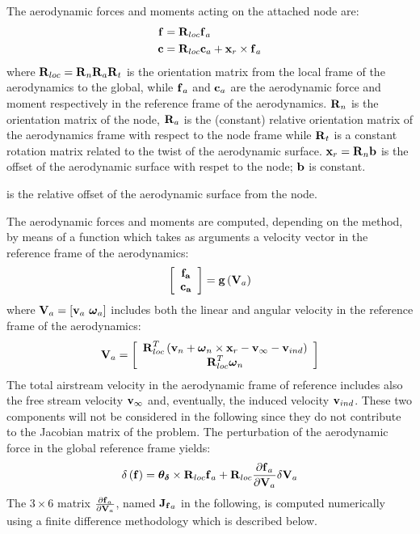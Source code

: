 The aerodynamic forces and moments acting on the attached node are:
\begin{subequations}
\begin{align}
	\T{f} &= \T{R}_{loc} \T{f}_a\\ 
	\T{c} &= \T{R}_{loc} \T{c}_a + \T{x}_r\times\T{f}_a 
\end{align}
\end{subequations}
where $\T{R}_{loc} = \T{R}_n\T{R}_a\T{R}_t$ is the orientation 
matrix from the local frame of the aerodynamics to the global, 
while $\T{f}_a$ and $\T{c}_a$ are the aerodynamic force and moment 
respectively in the reference frame of the aerodynamics. $\T{R}_n$
is the orientation matrix of the node, $\T{R}_a$ is the (constant) 
relative orientation matrix of the aerodynamics frame with respect 
to the node frame while $\T{R}_t$ is a constant rotation matrix 
related to the twist of the aerodynamic surface. $\T{x}_r = \T{R}_n\T{b}$ 
is the offset of the aerodynamic surface with respet to the node; 
$\T{b}$ is constant.

is the relative offset of the aerodynamic surface from the node.

The aerodynamic forces and moments are computed, depending on the method, 
by means of a function which takes as arguments a velocity vector
in the reference frame of the aerodynamics:
\begin{equation}
	\sqbr{\matr{c}{\T{f_a}\\\T{c_a}}} = \T{g}\plbr{\T{V}_{a}}
\end{equation}
where $\T{V}_{a} = \sqbr{\T{v}_a\ \T{\omega}_a}$ includes both the 
linear and angular velocity in the reference frame of the aerodynamics:
\begin{equation}
	\T{V}_{a} = \sqbr{\matr{c}{
		\T{R}^T_{loc} \plbr{\T{v}_n + \T{\omega}_n\times\T{x}_r - \T{v}_{\infty} - \T{v}_{ind}}\\
		\T{R}^T_{loc} \T{\omega}_n
		}}
\end{equation}
The total airstream velocity in the aerodynamic frame of reference 
includes also the free stream velocity $\T{v}_{\infty}$ and, eventually, 
the induced velocity $\T{v}_{ind}$. These two components will not be 
considered in the following since they do not contribute to the 
Jacobian matrix of the problem. 
The perturbation of the aerodynamic force in the global reference frame
yields:
\begin{equation}
	\delta\plbr{\T{f}} = \T{\theta_{\delta}}\times\T{R}_{loc}\T{f}_a + 
				\T{R}_{loc}\frac{\partial\T{f}_a}{\partial\T{V}_a}
				\delta\T{V}_a
\end{equation}
The $3\times6$ matrix $\frac{\partial\T{f}_a}{\partial\T{V}_a}$, 
named $\T{J_f}_a$ in the
following, is computed numerically using a finite difference methodology
which is described below.

